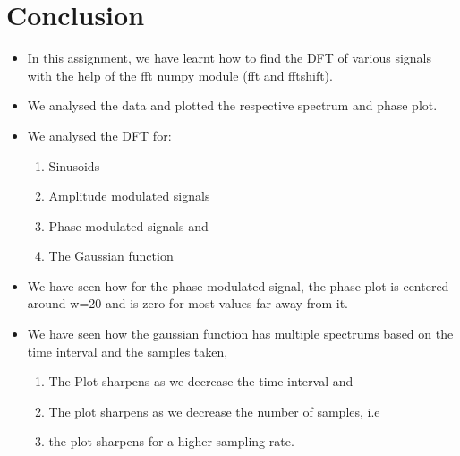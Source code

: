 \documentclass[11pt]{article}
\begin{document}
\section{Conclusion}
\begin{itemize}
    \item In this assignment, we have learnt how to find the DFT of various signals with the help of the fft numpy module (fft and fftshift).
    \item We analysed the data and plotted the respective spectrum and phase plot.
    \item We analysed the DFT for: 
    \begin{enumerate}
        \item Sinusoids
        \item Amplitude modulated signals
        \item Phase modulated signals and
        \item The Gaussian function
    \end{enumerate}
    \item We have seen how for the phase modulated signal, the phase plot is centered around w=20 and is zero for most values far away from it.
    \item We have seen how the gaussian function has multiple spectrums based on the time interval and the samples taken,
    \begin{enumerate}
        \item The Plot sharpens as we decrease the time interval and
        \item The plot sharpens as we decrease the number of samples, i.e
        \item the plot sharpens for a higher sampling rate.
    \end{enumerate}
\end{itemize}
\end{document}
